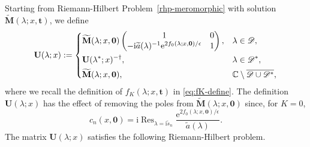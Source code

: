\documentclass[12pt]{amsart}
\numberwithin{equation}{section}
\newcommand{\ee}{\mathrm{e}}
\newcommand{\ii}{\mathrm{i}}
\newcommand{\SP}{\lambda}
\newcommand{\C}{\mathbb{C}}
\begin{document}
Starting from Riemann-Hilbert Problem~\ref{rhp-meromorphic} with 
solution $\widetilde{\mathbf{M}}(\SP;x,\mathbf{t})$, we define
\begin{equation}
\mathbf{U}(\SP;x):=
\begin{dcases}
\widetilde{\mathbf{M}}(\SP;x,\mathbf{0})\begin{pmatrix} 1 & 0\\
-\ii \widetilde{a}(\SP)^{-1}\ee^{2f_0(\SP;x,\mathbf{0})/\epsilon} & 1\end{pmatrix}, & \SP\in \mathscr{D}, \\
\mathbf{U}(\SP^*;x)^{-\dagger}, & \SP \in \mathscr{D}^*, \\
\widetilde{\mathbf{M}}(\SP;x,\mathbf{0}), & \C \setminus \overline{\mathscr{D} \cup \mathscr{D}^*},
\end{dcases}
\end{equation}
where we recall the definition of $f_K(\SP;x,\mathbf{t})$ in 
\eqref{eq:fK-define}.  The definition $\mathbf{U}(\lambda;x)$ has the effect 
of removing the poles from $\widetilde{\mathbf{M}}(\SP;x,\mathbf{0})$ since, 
for $K=0$,
\begin{equation}
c_n(x,\mathbf{0})=\ii\mathop{\mathrm{Res}}_{\SP=\ii \widetilde{s}_n}\frac{\ee^{2f_0(\SP;x,\mathbf{0})/\epsilon}}{\widetilde{a}(\SP)}.
\end{equation}
The matrix $\mathbf{U}(\lambda;x)$ satisfies the following Riemann-Hilbert problem.
\end{document}
